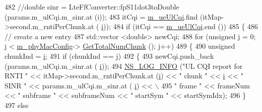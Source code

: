 \begin{DoxyCode}
482                                 \textcolor{comment}{//double sinr = LteFfConverter::fpS11dot3toDouble (params.m\_ulCqi.m\_sinr.at
       (i));}
483                                 itCqi = \hyperlink{classns3_1_1MmWaveFlexTtiMaxRateMacScheduler_a6f9a468f0c48b60d9893fed1410d18cd}{m\_ueUlCqi}.find (itMap->second.m\_rntiPerChunk.at (
      \hyperlink{bernuolliDistribution_8m_a6f6ccfcf58b31cb6412107d9d5281426}{i}));
484                                 \textcolor{keywordflow}{if} (itCqi == \hyperlink{classns3_1_1MmWaveFlexTtiMaxRateMacScheduler_a6f9a468f0c48b60d9893fed1410d18cd}{m\_ueUlCqi}.end ())
485                                 \{
486                                         \textcolor{comment}{// create a new entry}
487                                         std::vector <double> newCqi;
488                                         \textcolor{keywordflow}{for} (\textcolor{keywordtype}{unsigned} j = 0; j < \hyperlink{classns3_1_1MmWaveMacScheduler_a24d7af4971d2e500fe543cefbafa2fd9}{m\_phyMacConfig}->
      \hyperlink{classns3_1_1MmWavePhyMacCommon_a97e82c809a351fea9d5058ac1bb4c3c6}{GetTotalNumChunk} (); j++)
489                                         \{
490                                                 \textcolor{keywordtype}{unsigned} chunkInd = \hyperlink{bernuolliDistribution_8m_a6f6ccfcf58b31cb6412107d9d5281426}{i};
491                                                 \textcolor{keywordflow}{if} (chunkInd == j)
492                                                 \{
493                                                         newCqi.push\_back (params.m\_ulCqi.m\_sinr.at (
      \hyperlink{bernuolliDistribution_8m_a6f6ccfcf58b31cb6412107d9d5281426}{i}));
494                                                         \hyperlink{group__logging_gafbd73ee2cf9f26b319f49086d8e860fb}{NS\_LOG\_INFO} (\textcolor{stringliteral}{"UL CQI report for RNTI "} 
      << itMap->second.m\_rntiPerChunk.at (\hyperlink{bernuolliDistribution_8m_a6f6ccfcf58b31cb6412107d9d5281426}{i}) << \textcolor{stringliteral}{" chunk "} << \hyperlink{bernuolliDistribution_8m_a6f6ccfcf58b31cb6412107d9d5281426}{i} << \textcolor{stringliteral}{" SINR "} << params.m\_ulCqi.m\_sinr.at (
      \hyperlink{bernuolliDistribution_8m_a6f6ccfcf58b31cb6412107d9d5281426}{i}) << \(\backslash\)
495                                                                      \textcolor{stringliteral}{" frame "} << frameNum << \textcolor{stringliteral}{" subframe "} 
      << subframeNum << \textcolor{stringliteral}{" startSym "} << startSymIdx);
496                                                 \}
497                                                 \textcolor{keywordflow}{else}

\end{DoxyCode}
